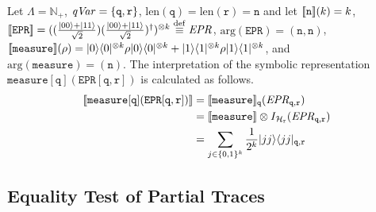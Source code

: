 \begin{ex}
 Let $\Lambda = \mathbb{N}_+$, $\mathit{qVar} = \{\mathtt{q}, \mathtt{r}\}$,
 $\mathrm{len}(\mathtt{q})=
 \mathrm{len}(\mathtt{r})=\mathtt{n}$ and let
 $[\![\mathtt{n}]\!](k) = k$, $[\![\mathtt{EPR}]\!] =
 ((\frac{|00\rangle
 + |11\rangle}{\sqrt{2}})
 (\frac{|00\rangle
 + |11\rangle}{\sqrt{2}})^\dagger)^{\otimes k} \overset{\mathrm{def}}{\equiv} \mathit{EPR}$,
 $\mathrm{arg}(\mathtt{EPR})=(\mathtt{n},\mathtt{n})$, \\
 $[\![\mathtt{measure}]\!] (\rho) = |0\rangle\langle 0|^{\otimes k}
 \rho |0\rangle\langle 0|^{\otimes k} + |1\rangle\langle 1|^{\otimes k} \rho
 |1\rangle\langle 1|^{\otimes k}$, and
 $\mathrm{arg}(\mathtt{measure})=(\mathtt{n})$.
 The interpretation of the symbolic representation
 $\mathtt{measure[q](EPR[q,r])}$ is calculated as follows.
 \begin{align*}
  [\![\mathtt{measure[q](EPR[q,r])}]\!]
  &= [\![\mathtt{measure}]\!]_{\mathtt{q}} (\mathit{EPR}_{\mathtt{q},
  \mathtt{r}})\\
  &= [\![\mathtt{measure}]\!] \otimes I_{\mathcal{H}_\mathtt{r}}
   (\mathit{EPR}_{\mathtt{q}, \mathtt{r}})\\
  &= \sum_{j \in \{0,1\}^k} \frac{1}{2^k}|jj\rangle\langle jj|_{\mathtt{q},
  \mathtt{r}}
 \end{align*}
\end{ex}

\subsection{Equality Test of Partial Traces}

